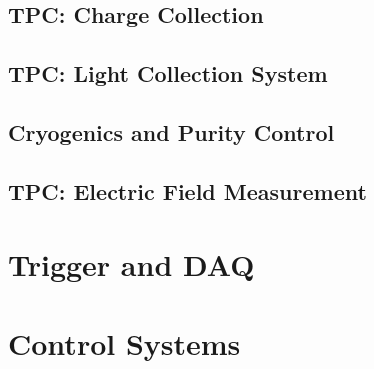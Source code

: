 \subsection{TPC: Charge Collection}\label{sec:TPC}
\subsection{TPC: Light Collection System}
\subsection{Cryogenics and Purity Control}
\subsection{TPC: Electric Field Measurement}
\section{Trigger and DAQ}
\section{Control Systems}

